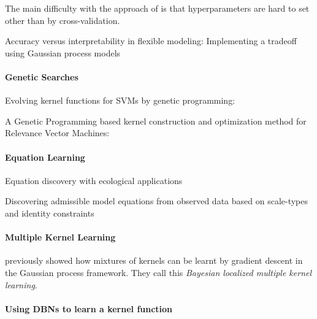 \documentclass[twoside]{article}
\begin{document}
The main difficulty with the approach of \cite{DBLP:journals/corr/abs-0909-0844} is that hyperparameters are hard to set other than by cross-validation. 

Accuracy versus interpretability in flexible modeling: Implementing a tradeoff using Gaussian process models \cite{plate1999accuracy}


\paragraph{Genetic Searches}

Evolving kernel functions for SVMs by genetic programming: \cite{diosan2007evolving}

A Genetic Programming based kernel construction and optimization method for Relevance Vector Machines: \cite{bing2010gp}

\paragraph{Equation Learning}

Equation discovery with ecological applications \cite{dzeroski1999equation}

Discovering admissible model equations from observed data based on scale-types and identity constraints \cite{washio1999discovering}

\paragraph{Multiple Kernel Learning}

\cite{christoudias2009bayesian} previously showed how mixtures of kernels can be learnt by gradient descent in the Gaussian process framework.
They call this \emph{Bayesian localized multiple kernel learning}.

\paragraph{Using DBNs to learn a kernel function}
\end{document}
